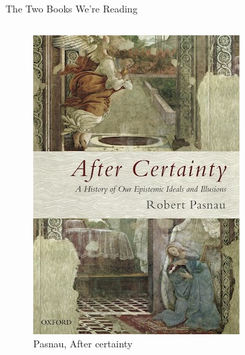 \documentclass[
  17pt,
  letterpaper,
  ignorenonframetext,
  aspectratio=169,
]{beamer}
\begin{document}
\begin{frame}{The Two Books We're Reading}
\protect\hypertarget{the-two-books-were-reading}{}
\begin{columns}[T]
\begin{column}{0.48\textwidth}
\begin{figure}

{\centering \includegraphics[width=\textwidth,height=0.6\textheight]{../images/pasnau_cover.jpeg}

}

\caption{Pasnau, After certainty}

\end{figure}
\end{column}

\begin{column}{0.48\textwidth}
\begin{figure}


\end{figure}
\end{column}
\end{columns}
\end{frame}
\end{document}
